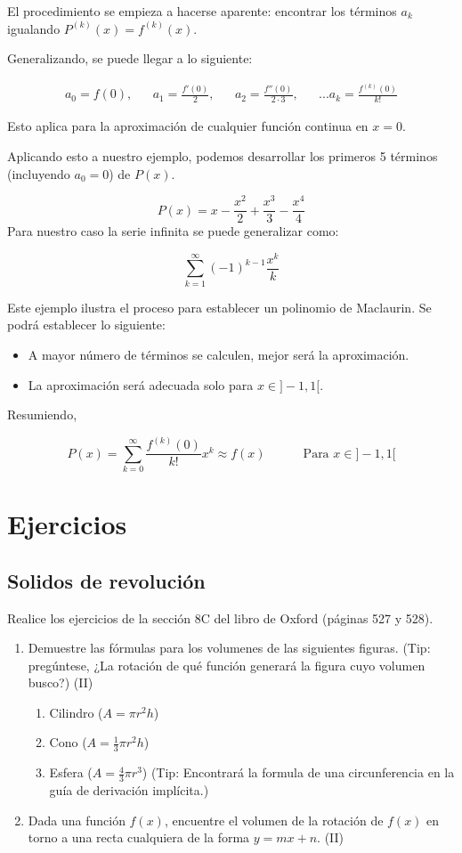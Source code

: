 \documentclass[spanish,12pt]{article}
\begin{document}
El procedimiento se empieza a hacerse aparente: encontrar los términos $a_k$ igualando $P^{(k)}(x)=f^{(k)}(x)$. 

Generalizando, se puede llegar a lo siguiente:

\begin{align*}
    a_0=f(0),&& a_1=\frac{f'(0)}{2},&& a_2=\frac{f''(0)}{2\cdot3},&& ... a_k=\frac{f^{(k)}(0)}{k!}
\end{align*}

Esto aplica para la aproximación de cualquier función continua en $x=0$.

Aplicando esto a nuestro ejemplo, podemos desarrollar los primeros 5 términos (incluyendo $a_0=0$) de $P(x)$.

$$P(x)=x-\frac{x^2}{2}+\frac{x^3}{3}-\frac{x^4}{4}$$
Para nuestro caso la serie infinita se puede generalizar como:

$$\sum_{k=1}^{\infty}(-1)^{k-1}\frac{x^k}{k}$$

Este ejemplo ilustra el proceso para establecer un polinomio de Maclaurin. Se podrá establecer lo siguiente:
\begin{itemize}
    \item A mayor número de términos se calculen, mejor será la aproximación.
    \item La aproximación será adecuada solo para $x\in]-1,1[$.
\end{itemize}
Resumiendo,

$$P(x)=\sum_{k=0}^{\infty}\frac{f^{(k)}(0)}{k!}x^k\approx f(x)\quad\quad\quad\text{Para } x\in]-1,1[$$

\section{Ejercicios}
\subsection{Solidos de revolución}
Realice los ejercicios de la sección 8C del libro de Oxford (páginas 527 y 528).
\begin{enumerate}[1)]
    \item Demuestre las fórmulas para los volumenes de las siguientes figuras. (Tip: pregúntese, ¿La rotación de qué función generará la figura cuyo volumen busco?) (II)
    \begin{enumerate}
        \item Cilindro ($A=\pi r^2h$)
        \item Cono ($A=\frac{1}{3}\pi r^2h$)
        \item Esfera ($A=\frac{4}{3}\pi r^3$) (Tip: Encontrará la formula de una circunferencia en la guía de derivación implícita.)
    \end{enumerate}
    \item Dada una función $f(x)$, encuentre el volumen de la rotación de $f(x)$ en torno a una recta cualquiera de la forma $y=mx+n$. (II)
\end{enumerate}
\end{document}

